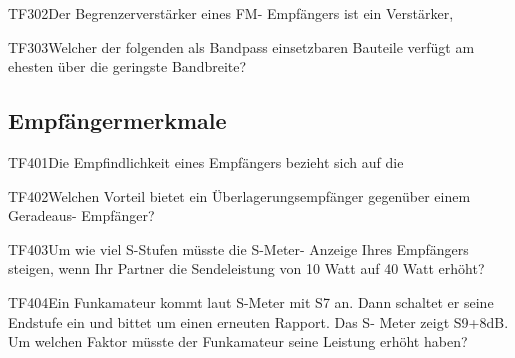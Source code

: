 \begin{question}{TF302}{Der Begrenzerverstärker eines FM- Empfängers ist ein Verstärker,}
\end{question}

\begin{question}{TF303}{Welcher der folgenden als Bandpass einsetzbaren Bauteile verfügt am ehesten über die geringste Bandbreite?}
\end{question}

\subsection{Empfängermerkmale}

\begin{question}{TF401}{Die Empfindlichkeit eines Empfängers bezieht sich auf die}
\end{question}

\begin{question}{TF402}{Welchen Vorteil bietet ein Überlagerungsempfänger gegenüber einem Geradeaus- Empfänger?}
\end{question}

\begin{question}{TF403}{Um wie viel S-Stufen müsste die S-Meter- Anzeige Ihres Empfängers steigen, wenn Ihr Partner die Sendeleistung von 10 Watt auf 40 Watt erhöht?}
\end{question}

\begin{question}{TF404}{Ein Funkamateur kommt laut S-Meter mit S7 an. Dann schaltet er seine Endstufe ein und bittet um einen erneuten Rapport. Das S- Meter zeigt S9+8dB. Um welchen Faktor müsste der Funkamateur seine Leistung erhöht haben?}
\end{question}

